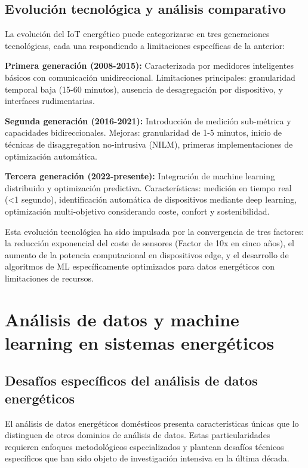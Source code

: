 \subsection{Evolución tecnológica y análisis comparativo}

La evolución del IoT energético puede categorizarse en tres generaciones tecnológicas, cada una respondiendo a limitaciones específicas de la anterior:

\textbf{Primera generación (2008-2015):} Caracterizada por medidores inteligentes básicos con comunicación unidireccional. Limitaciones principales: granularidad temporal baja (15-60 minutos), ausencia de desagregación por dispositivo, y interfaces rudimentarias.

\textbf{Segunda generación (2016-2021):} Introducción de medición sub-métrica y capacidades bidireccionales. Mejoras: granularidad de 1-5 minutos, inicio de técnicas de disaggregation no-intrusiva (NILM), primeras implementaciones de optimización automática.

\textbf{Tercera generación (2022-presente):} Integración de machine learning distribuido y optimización predictiva. Características: medición en tiempo real (<1 segundo), identificación automática de dispositivos mediante deep learning, optimización multi-objetivo considerando coste, confort y sostenibilidad.

Esta evolución tecnológica ha sido impulsada por la convergencia de tres factores: la reducción exponencial del coste de sensores (Factor de 10x en cinco años), el aumento de la potencia computacional en dispositivos edge, y el desarrollo de algoritmos de ML específicamente optimizados para datos energéticos con limitaciones de recursos.

\section{Análisis de datos y machine learning en sistemas energéticos}

\subsection{Desafíos específicos del análisis de datos energéticos}

El análisis de datos energéticos domésticos presenta características únicas que lo distinguen de otros dominios de análisis de datos. Estas particularidades requieren enfoques metodológicos especializados y plantean desafíos técnicos específicos que han sido objeto de investigación intensiva en la última década.


